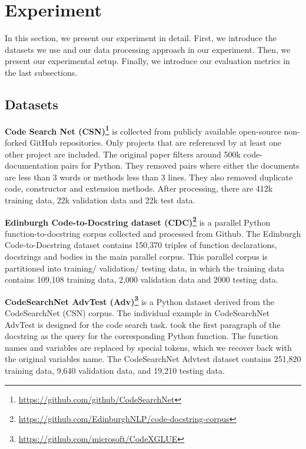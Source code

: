 \documentclass[11pt]{article}
\begin{document}
\section{Experiment}
In this section, we present our experiment in detail. First, we introduce the datasets we use and our data processing approach in our experiment. Then, we present our experimental setup. Finally, we introduce our evaluation metrics in the last subsections.
 
\subsection{Datasets}
\textbf{Code Search Net (CSN)\footnote{\hyperref[]{https://github.com/github/CodeSearchNet}}} \citep{Husain2019CodeSearchNetCE} is collected from publicly available open-source non-forked GitHub repositories. Only projects that are referenced by at least one other project are included.
The original paper filters around 500k code-documentation pairs for Python. They removed pairs where either the documents are less than 3 words or methods less than 3 lines. They also removed duplicate code, constructor and extension methods. After processing, there are 412k training data, 22k validation data and 22k test data. 



\textbf{Edinburgh Code-to-Docstring dataset (CDC)\footnote{\hyperref[]{https://github.com/EdinburghNLP/code-docstring-corpus}}} \citep{Barone2017APC} is a parallel Python function-to-docstring corpus collected and processed from Github. The Edinburgh Code-to-Docstring dataset contains 150,370 triples of function declarations, docstrings and bodies in the main parallel corpus. This parallel corpus is partitioned into training/ validation/ testing data, in which the training data contains 109,108 training data, 2,000 validation data and 2000 testing data.





\textbf{CodeSearchNet AdvTest (Adv)\footnote{\hyperref[]{https://github.com/microsoft/CodeXGLUE}}} \citep{Lu2021CodeXGLUEAM} is a Python dataset derived from the CodeSearchNet (CSN) corpus. The individual example in CodeSearchNet AdvTest is designed for the code search task. \citep{Lu2021CodeXGLUEAM} took the first paragraph of the docstring as the query for the corresponding Python function.  The function names and variables are replaced by special tokens, which we recover back with the original variables name.
The CodeSearchNet Advtest dataset contains 251,820 training data, 9,640 validation data, and 19,210 testing data. 
\end{document}

